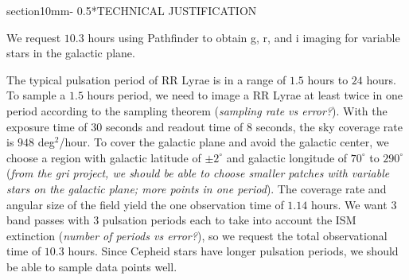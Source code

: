 \documentclass[letterpaper,11pt]{article}
\makeatletter
\renewcommand{\section}{\@startsection%
{section}{1}{0mm}{-\baselineskip}%
{0.5\baselineskip}{\normalfont\Large\bfseries}}%
\makeatother
\begin{document}
\noindent{}

\noindent{}

\noindent{}

\noindent{}


\clearpage
\section*{TECHNICAL JUSTIFICATION}


We request $10.3$ hours using Pathfinder to obtain g, r, and i imaging for variable stars in the galactic plane.

\vspace{3mm} %

\noindent The typical pulsation period of RR Lyrae is in a range of $1.5$ hours to $24$ hours. To sample a $1.5$ hours period, we need to image a RR Lyrae at least twice in one period according to the sampling theorem (\textit{sampling rate vs error?}). With the exposure time of $30$ seconds and readout time of $8$ seconds, the sky coverage rate is $948$ deg$^2$/hour. To cover the galactic plane and avoid the galactic center, we choose a region with galactic latitude of $\pm 2 ^\circ$ and galactic longitude of $70 ^\circ$ to $290 ^\circ$ (\textit{from the gri project, we should be able to choose smaller patches with variable stars on the galactic plane; more points in one period}). The coverage rate and angular size of the field yield the one observation time of $1.14$ hours. We want $3$ band passes with $3$ pulsation periods each to take into account the ISM extinction (\textit{number of periods vs error?}), so we request the total observational time of $10.3$ hours. Since Cepheid stars have longer pulsation periods, we should be able to sample data points well.
\end{document}
